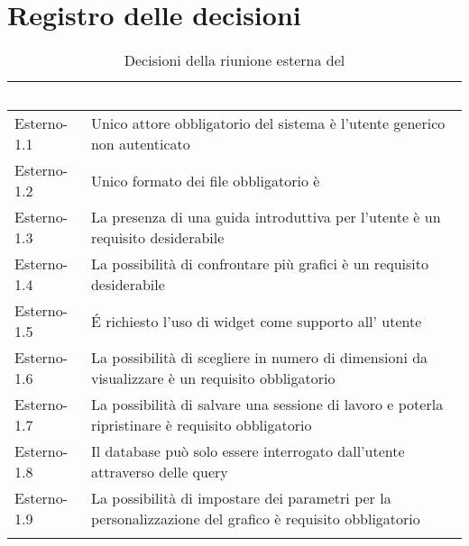 \section{Registro delle decisioni}
{
\renewcommand{\arraystretch}{1.5}
\centering
\begin{longtable}{C{3cm} C{9cm}}
\textcolor{white}{\textbf{Codice}}&
\textcolor{white}{\textbf{Decisione}}\\	
\endhead
		
Esterno-1.1 & Unico attore obbligatorio del sistema è l'utente generico non autenticato\\

Esterno-1.2 & Unico formato dei file obbligatorio è \\

Esterno-1.3 & La presenza di una guida introduttiva per l'utente è un requisito desiderabile\\

Esterno-1.4 & La possibilità di confrontare più grafici è un requisito desiderabile\\

Esterno-1.5 & \'E richiesto l'uso di widget come supporto all' utente\\

Esterno-1.6 & La possibilità di scegliere in numero di dimensioni da visualizzare è un requisito obbligatorio\\

Esterno-1.7 & La possibilità di salvare una sessione di lavoro e poterla ripristinare è requisito obbligatorio\\

Esterno-1.8 & Il database può solo essere interrogato dall'utente attraverso delle query\\

Esterno-1.9 & La possibilità di impostare dei parametri per la personalizzazione del grafico è requisito obbligatorio\\

\caption{Decisioni della riunione esterna del \Data{}}
		
\end{longtable}
}
